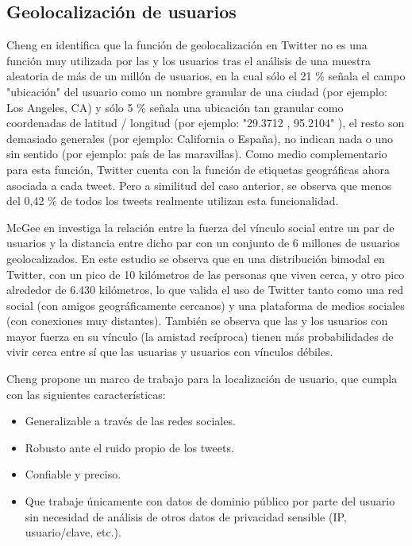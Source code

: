 \subsection{Geolocalización de usuarios}

 Cheng en \cite{Cheng:2010:YYT:1871437.1871535} identifica que la función de geolocalización en Twitter no es una función muy utilizada por las y los usuarios tras el análisis de una muestra aleatoria de más de un millón de usuarios, en la cual sólo el 21 \% señala el campo "ubicación" del usuario como un nombre granular de una ciudad (por ejemplo: Los Angeles, CA) y sólo 5 \% señala una ubicación tan granular como coordenadas de latitud / longitud (por ejemplo: "29.3712 , 95.2104" ), el resto son demasiado generales (por ejemplo: California o España), no indican nada o uno sin sentido (por ejemplo: país de las maravillas). Como medio complementario para esta función, Twitter cuenta con la función de etiquetas geográficas ahora asociada a cada tweet. Pero a similitud del caso anterior, se observa que menos del 0,42 \% de todos los tweets realmente utilizan esta funcionalidad.

McGee en \cite{McGee:2011:GST:2063576.2063959} investiga la relación entre la fuerza del vínculo social entre un par de usuarios y la distancia entre dicho par con un conjunto de 6 millones de usuarios geolocalizados. En este estudio se observa que en una distribución bimodal en Twitter, con un pico de 10 kilómetros de las personas que viven cerca, y otro pico alrededor de 6.430 kilómetros, lo que valida el uso de Twitter tanto como una red social (con amigos geográficamente cercanos) y una plataforma de medios sociales (con conexiones muy distantes). También se observa que las y los usuarios con mayor fuerza en su vínculo (la amistad recíproca) tienen más probabilidades de vivir cerca entre sí que las usuarias y usuarios con vínculos débiles.

Cheng propone un marco de trabajo para la localización de usuario, que cumpla con las siguientes características:
\begin{itemize}
 \item Generalizable a través de las redes sociales.
 \item Robusto ante el ruido propio de los tweets.
 \item Confiable y preciso.
 \item Que trabaje únicamente con datos de dominio público por parte del usuario sin necesidad de análisis de otros datos de privacidad sensible (IP, usuario/clave, etc.).
\end{itemize}

